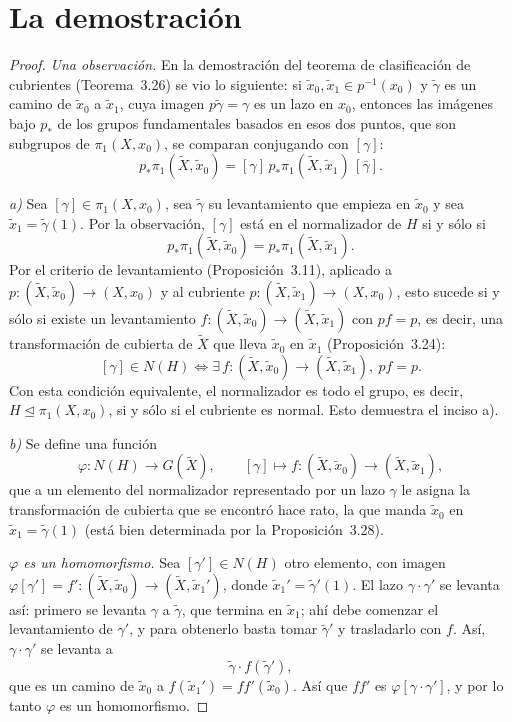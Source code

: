 \documentclass[11pt]{article}
\begin{document}
\section*{La demostración}

\begin{proof}
\emph{Una observación.} En la demostración del teorema de clasificación de cubrientes (Teorema~3.26) se vio lo siguiente: si $\tilde x_0,\tilde x_1\in p^{-1}(x_0)$ y $\tilde\gamma$ es un camino de $\tilde x_0$ a $\tilde x_1$, cuya imagen $p\tilde\gamma=\gamma$ es un lazo en $x_0$, entonces las imágenes bajo $p_*$ de los grupos fundamentales basados en esos dos puntos, que son subgrupos de $\pi_1(X,x_0)$, se comparan conjugando con $[\gamma]$:
\[
  p_*\pi_1(\tilde X,\tilde x_0)=[\gamma]\,p_*\pi_1(\tilde X,\tilde x_1)\,[\bar\gamma] .
\]

\medskip\noindent\emph{a)} Sea $[\gamma]\in\pi_1(X,x_0)$, sea $\tilde\gamma$ su levantamiento que empieza en $\tilde x_0$ y sea $\tilde x_1=\tilde\gamma(1)$. Por la observación, $[\gamma]$ está en el normalizador de $H$ si y sólo si
\[
  p_*\pi_1(\tilde X,\tilde x_0)=p_*\pi_1(\tilde X,\tilde x_1).
\]
Por el criterio de levantamiento (Proposición~3.11), aplicado a $p\colon(\tilde X,\tilde x_0)\to(X,x_0)$ y al cubriente $p\colon(\tilde X,\tilde x_1)\to(X,x_0)$, esto sucede si y sólo si existe un levantamiento $f\colon(\tilde X,\tilde x_0)\to(\tilde X,\tilde x_1)$ con $pf=p$, es decir, una transformación de cubierta de $\tilde X$ que lleva $\tilde x_0$ en $\tilde x_1$ (Proposición~3.24):
\[
  [\gamma]\in N(H)\iff\exists\,f\colon(\tilde X,\tilde x_0)\to(\tilde X,\tilde x_1),\ pf=p .
\]
Con esta condición equivalente, el normalizador es todo el grupo, es decir, $H\trianglelefteq\pi_1(X,x_0)$, si y sólo si el cubriente es normal. Esto demuestra el inciso a).

\medskip\noindent\emph{b)} Se define una función
\[
  \varphi\colon N(H)\to G(\tilde X),\qquad [\gamma]\longmapsto f\colon(\tilde X,\tilde x_0)\to(\tilde X,\tilde x_1),
\]
que a un elemento del normalizador representado por un lazo $\gamma$ le asigna la transformación de cubierta que se encontró hace rato, la que manda $\tilde x_0$ en $\tilde x_1=\tilde\gamma(1)$ (está bien determinada por la Proposición~3.28).

\emph{$\varphi$ es un homomorfismo.} Sea $[\gamma']\in N(H)$ otro elemento, con imagen $\varphi[\gamma']=f'\colon(\tilde X,\tilde x_0)\to(\tilde X,\tilde x_1')$, donde $\tilde x_1'=\tilde\gamma'(1)$. El lazo $\gamma\cdot\gamma'$ se levanta así: primero se levanta $\gamma$ a $\tilde\gamma$, que termina en $\tilde x_1$; ahí debe comenzar el levantamiento de $\gamma'$, y para obtenerlo basta tomar $\tilde\gamma'$ y trasladarlo con $f$. Así, $\gamma\cdot\gamma'$ se levanta a
\[
  \tilde\gamma\cdot f(\tilde\gamma'),
\]
que es un camino de $\tilde x_0$ a $f(\tilde x_1')=ff'(\tilde x_0)$. Así que $ff'$ es $\varphi[\gamma\cdot\gamma']$, y por lo tanto $\varphi$ es un homomorfismo.


\end{proof}
\end{document}
